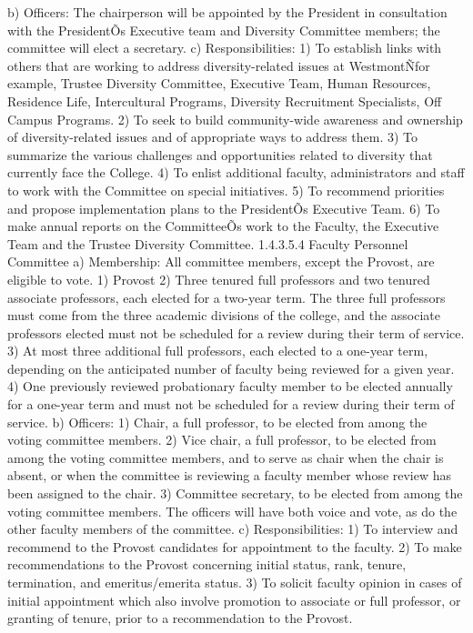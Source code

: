 \documentclass[letterpaper, 11pt]{article}
\begin{document}
b) Officers:
   The chairperson will be appointed by the President in consultation with the PresidentÕs Executive team and Diversity Committee members; the committee will elect a secretary.
c) Responsibilities:
1) To establish links with others that are working to address diversity-related issues at WestmontÑfor example, Trustee Diversity Committee, Executive Team, Human Resources, Residence Life, Intercultural Programs, Diversity Recruitment Specialists, Off Campus Programs. 
2) To seek to build community-wide awareness and ownership of diversity-related issues and of appropriate ways to address them.
3) To summarize the various challenges and opportunities related to diversity that currently face the College. 
4) To enlist additional faculty, administrators and staff to work with the Committee on special initiatives.
5) To recommend priorities and propose implementation plans to the PresidentÕs Executive Team.
6) To make annual reports on the CommitteeÕs work to the Faculty, the Executive Team and the Trustee Diversity Committee.
1.4.3.5.4 Faculty Personnel Committee
a) Membership:
   All committee members, except the Provost, are eligible to vote.
1) Provost
2) Three tenured full professors and two tenured associate professors, each elected for a two-year term.  The three full professors must come from the three academic divisions of the college, and the associate professors elected must not be scheduled for a review during their term of service.
3) At most three additional full professors, each elected to a one-year term, depending on the anticipated number of faculty being reviewed for a given year.
4) One previously reviewed probationary faculty member to be elected annually for a one-year term and must not be scheduled for a review during their term of service.
b) Officers:
1) Chair, a full professor, to be elected from among the voting committee members.
2) Vice chair, a full professor, to be elected from among the voting committee members, and to serve as chair when the chair is absent, or when the committee is reviewing a faculty member whose review has been assigned to the chair.
3) Committee secretary, to be elected from among the voting committee members.  The officers will have both voice and vote, as do the other faculty members of the committee.
c) Responsibilities:
1) To interview and recommend to the Provost candidates for appointment to the faculty.
2) To make recommendations to the Provost concerning initial status, rank, tenure, termination, and emeritus/emerita status.
3) To solicit faculty opinion in cases of initial appointment which also involve promotion to associate or full professor, or granting of tenure, prior to a recommendation to the Provost.
\end{document}
